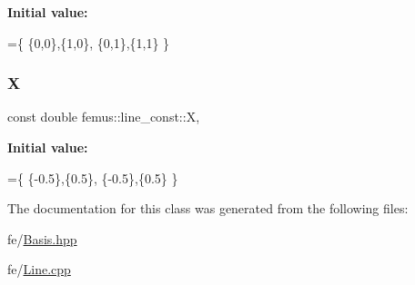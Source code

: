 {\bfseries Initial value\+:}
\begin{DoxyCode}
=\{ 
    \{0,0\},\{1,0\},
    \{0,1\},\{1,1\}
  \}
\end{DoxyCode}
\mbox{\label{classfemus_1_1line__const_a96d93d264579499205b13a66b85b1fb5}} 
\subsubsection{\texorpdfstring{X}{X}}
{\footnotesize\ttfamily const double femus\+::line\+\_\+const\+::X\hspace{0.3cm}{\ttfamily [static]}, {\ttfamily [protected]}}

{\bfseries Initial value\+:}
\begin{DoxyCode}
=\{ 
    \{-0.5\},\{0.5\},
    \{-0.5\},\{0.5\}
  \}
\end{DoxyCode}


The documentation for this class was generated from the following files\+:\begin{DoxyCompactItemize}
\item 
fe/\mbox{\hyperlink{_basis_8hpp}{Basis.\+hpp}}\item 
fe/\mbox{\hyperlink{fe_2_line_8cpp}{Line.\+cpp}}\end{DoxyCompactItemize}
